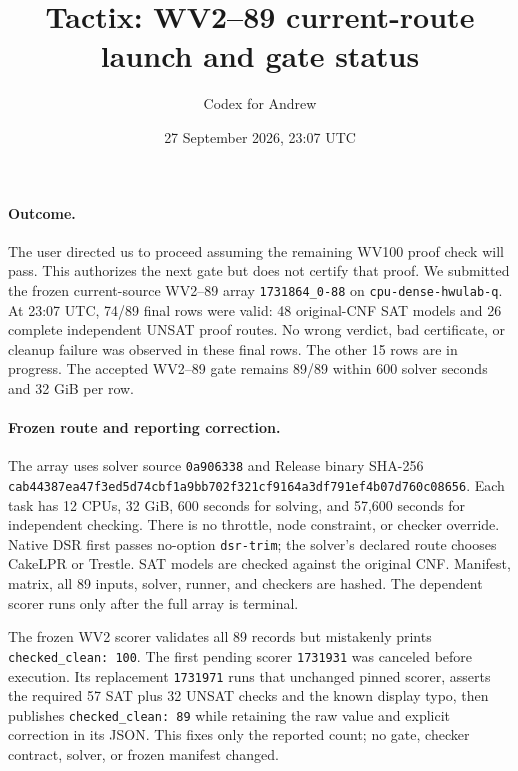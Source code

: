 \documentclass[11pt]{article}
\title{Tactix: WV2--89 current-route launch and gate status}
\author{Codex for Andrew}
\date{27 September 2026, 23:07 UTC}
\begin{document}
\maketitle

\paragraph{Outcome.}
The user directed us to proceed assuming the remaining WV100 proof check will
pass. This authorizes the next gate but does not certify that proof. We
submitted the frozen current-source WV2--89 array \texttt{1731864\_0-88} on
\texttt{cpu-dense-hwulab-q}. At 23:07 UTC, 74/89 final rows were valid: 48
original-CNF SAT models and 26 complete independent UNSAT proof routes. No
wrong verdict, bad certificate, or cleanup failure was observed in these final
rows. The other 15 rows are in progress. The accepted WV2--89 gate remains
89/89 within 600 solver seconds and 32 GiB per row.

\paragraph{Frozen route and reporting correction.}
The array uses solver source \texttt{0a906338} and Release binary SHA-256
\texttt{cab44387ea47f3ed5d74cbf1a9bb702f321cf9164a3df791ef4b07d760c08656}.
Each task has 12 CPUs, 32 GiB, 600 seconds for solving, and 57,600 seconds for
independent checking. There is no throttle, node constraint, or checker
override. Native DSR first passes no-option \texttt{dsr-trim}; the solver's
declared route chooses CakeLPR or Trestle. SAT models are checked against the
original CNF. Manifest, matrix, all 89 inputs, solver, runner, and checkers are
hashed. The dependent scorer runs only after the full array is terminal.

The frozen WV2 scorer validates all 89 records but mistakenly prints
\texttt{checked\_clean: 100}. The first pending scorer \texttt{1731931} was
canceled before execution. Its replacement \texttt{1731971} runs that unchanged
pinned scorer, asserts the required 57 SAT plus 32 UNSAT checks and the known
display typo, then publishes \texttt{checked\_clean: 89} while retaining the
raw value and explicit correction in its JSON. This fixes only the reported
count; no gate, checker contract, solver, or frozen manifest changed.
\end{document}
